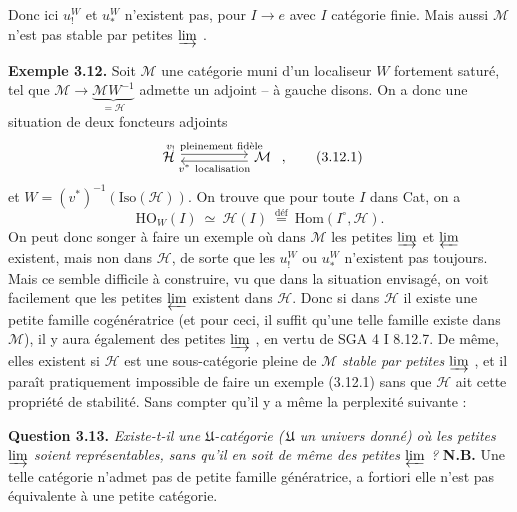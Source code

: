 Donc ici $u_!^W$ et $u_*^W$ n'existent pas, pour $I \longrightarrow e$ avec $I$ catégorie finie. Mais aussi $\mathcal{M}$ n'est pas stable par petites $\varinjlim$ .

\textbf{Exemple 3.12.} Soit $\mathcal{M}$ une catégorie muni d'un localiseur $W$ fortement saturé, tel que $\mathcal{M} \longrightarrow \underbrace{\mathcal{M}W^{-1}}_{=\mathcal{H}}$ admette un adjoint -- à gauche disons. On a donc une situation de deux foncteurs adjoints %
\[
\begin{tikzcd}[column sep=huge]
\mathcal{H} \arrow[r, shift left, "v_!\ \text{pleinement fidèle}"] & \mathcal{M} \arrow[l, shift left, "v^*\ \text{localisation}"]
\end{tikzcd}
\ , \tag*{(3.12.1)}
\]
et $W=(v^*)^{-1}(\mathrm{Iso}(\mathcal{H}))$. On trouve que pour toute $I$ dans Cat, on a
\[
\mathrm{HO}_W(I) \ \simeq \ \mathcal{H}(I) \ \overset{\text{déf}}{=} \ \mathrm{Hom}(I^\circ,\mathcal{H}). \tag*{(3.12.2)} %
\]
On peut donc songer à faire un exemple où dans $\mathcal{M}$ les petites $\varinjlim$ et $\varprojlim$ existent, mais non dans $\mathcal{H}$, de sorte que les $u_!^W$ ou $u_*^W$ n'existent pas toujours. Mais ce semble difficile à construire, vu que dans la situation envisagé, on voit facilement que les petites $\varprojlim$ existent dans $\mathcal{H}$. Donc si dans $\mathcal{H}$ %
il existe une petite famille cogénératrice (et pour ceci, il suffit qu'une telle famille existe dans $\mathcal{M}$), il y aura également des petites $\varinjlim$ , en vertu de SGA 4 I 8.12.7. De même, elles existent si $\mathcal{H}$ est une sous-catégorie pleine de $\mathcal{M}$ \textit{stable par petites} $\varinjlim$ , et il paraît pratiquement impossible de faire un exemple (3.12.1) sans que $\mathcal{H}$ ait cette propriété de stabilité. Sans compter qu'il y a même la perplexité suivante :

\marginpar{! \textbar}\textbf{Question 3.13.} \textit{Existe-t-il une $\mathfrak{U}$-catégorie (\,$\mathfrak{U}$ un univers donné) où les petites $\varinjlim$ soient représentables, sans qu'il en soit de même des petites $\varprojlim$ ?} \textbf{N.B.} Une telle catégorie n'admet pas de petite famille génératrice, a fortiori elle n'est pas équivalente à une petite catégorie.

